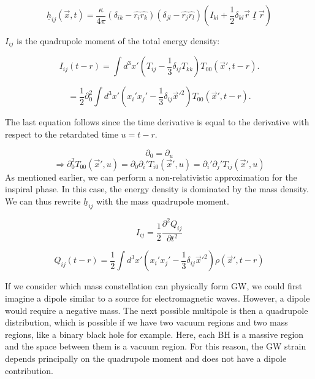 \begin{equation}
    \underline{h}_{ij}(\vec{x}, t)=\frac{\kappa}{4\pi}(\delta_{ik}-\hat{r_i}\hat{r_k})(\delta_{jl}-\hat{r_j}\hat{r_l})\left(I_{kl}+\frac{1}{2}\delta_{kl}\vec{r}\; \underline{I} \; \vec{r}\right)
\end{equation}

$I_{ij}$ is the quadrupole moment of the total energy density:

\begin{equation}
    I_{ij}(t-r)= \int d^3x' \left(T_{ij} -\frac{1}{3}\delta_{ij}T_{kk} \right)T_{00}(\vec{x}', t-r) .
\end{equation}

\begin{equation}
    = \frac{1}{2} \partial_0^2 \int d^3x' \left(x_i' x_j' -\frac{1}{3}\delta_{ij}\vec{x}'^2 \right)T_{00}(\vec{x}', t-r) .
\end{equation}

The last equation follows since the time derivative is equal to the derivative with respect to the retardated time $u=t-r$.

\begin{equation}
    \partial_0 = \partial_u
\end{equation}
\begin{equation}
    \Rightarrow \partial_0^2T_{00}(\vec{x}', u) = \partial_0 \partial_i' T_{i0}(\vec{x}', u) = \partial_i'\partial_j' T_{ij}(\vec{x}', u)
\end{equation}
As mentioned earlier, we can perform a non-relativistic approximation for the inspiral phase. In this case, the energy density is dominated by the mass density. We can thus rewrite $\underline{h}_{ij}$ with the mass quadrupole moment. 


\begin{equation}
    I_{ij}=\frac{1}{2}\frac{\partial^2 Q_{ij}}{{\partial t^2}}
\end{equation}

\begin{equation}
    Q_{ij}(t-r)=\frac{1}{2} \int d^3x' \left(x_i' x_j' -\frac{1}{3}\delta_{ij}\vec{x}'^2 \right)\rho(\vec{x}', t-r)
\end{equation}

If we consider which mass constellation can physically form GW, we could first imagine a dipole similar to a source for electromagnetic waves. However, a dipole would require a negative mass. The next possible multipole is then a quadrupole distribution, which is possible if we have two vacuum regions and two mass regions, like a binary black hole for example. Here, each BH is a massive region and the space between them is a vacuum region. For this reason, the GW strain depends principally on the quadrupole moment and does not have a dipole contribution.

